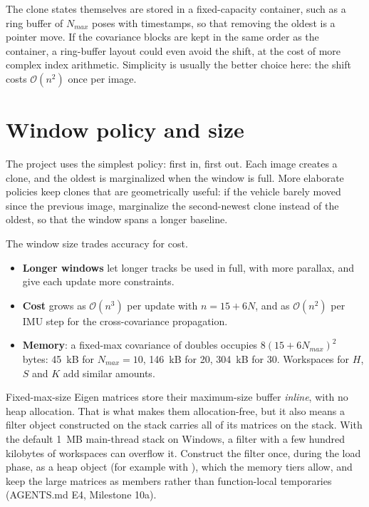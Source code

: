 The clone states themselves are stored in a fixed-capacity container, such as a ring buffer of $N_{max}$ poses with
timestamps, so that removing the oldest is a pointer move. If the covariance blocks are kept in the same order as the
container, a ring-buffer layout could even avoid the shift, at the cost of more complex index arithmetic. Simplicity is
usually the better choice here: the shift costs $\mathcal{O}(n^2)$ once per image.

\section{Window policy and size}

The project uses the simplest policy: first in, first out. Each image creates a clone, and the oldest is marginalized when
the window is full. More elaborate policies keep clones that are geometrically useful: if the vehicle barely moved since the
previous image, marginalize the second-newest clone instead of the oldest, so that the window spans a longer baseline.

The window size trades accuracy for cost.
\begin{itemize}
  \item \textbf{Longer windows} let longer tracks be used in full, with more parallax, and give each update more
        constraints.
  \item \textbf{Cost} grows as $\mathcal{O}(n^3)$ per update with $n = 15 + 6N$, and as $\mathcal{O}(n^2)$ per IMU step for the
        cross-covariance propagation.
  \item \textbf{Memory}: a fixed-max covariance of doubles occupies $8(15 + 6N_{max})^2$ bytes: 45~kB for $N_{max} = 10$, 146~kB for
        20, 304~kB for 30. Workspaces for $H$, $S$ and $K$ add similar amounts.
\end{itemize}

\begin{pitfall}
Fixed-max-size Eigen matrices store their maximum-size buffer \emph{inline}, with no heap allocation. That is what makes them
allocation-free, but it also means a filter object constructed on the stack carries all of its matrices on the stack. With
the default 1~MB main-thread stack on Windows, a filter with a few hundred kilobytes of workspaces can overflow it. Construct
the filter once, during the load phase, as a heap object (for example with ), which the memory tiers
allow, and keep the large matrices as members rather than function-local temporaries (AGENTS.md E4, Milestone 10a).
\end{pitfall}

